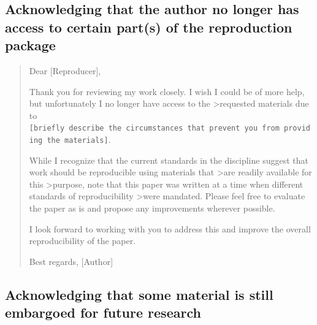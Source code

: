 \documentclass[]{book}
\begin{document}
\hypertarget{acknowledging-that-the-author-no-longer-has-access-to-certain-parts-of-the-reproduction-package}{%
\subsection{Acknowledging that the author no longer has access to certain part(s) of the reproduction package}\label{acknowledging-that-the-author-no-longer-has-access-to-certain-parts-of-the-reproduction-package}}

\begin{quote}
Dear {[}Reproducer{]},

Thank you for reviewing my work closely. I wish I could be of more help, but unfortunately I no longer have access to the \textgreater{}requested materials due to \texttt{{[}briefly\ describe\ the\ circumstances\ that\ prevent\ you\ from\ providing\ the\ materials{]}}.

While I recognize that the current standards in the discipline suggest that work should be reproducible using materials that \textgreater{}are readily available for this \textgreater{}purpose, note that this paper was written at a time when different standards of reproducibility \textgreater{}were mandated. Please feel free to evaluate the paper as is and propose any improvements wherever possible.

I look forward to working with you to address this and improve the overall reproducibility of the paper.

Best regards,
{[}Author{]}
\end{quote}

\hypertarget{acknowledging-that-some-material-is-still-embargoed-for-future-research}{%
\subsection{Acknowledging that some material is still embargoed for future research}\label{acknowledging-that-some-material-is-still-embargoed-for-future-research}}
\end{document}
